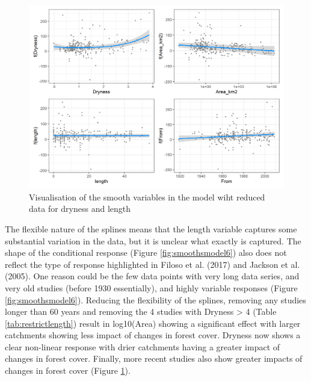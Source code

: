 \documentclass[]{elsarticle} %
\begin{document}
\begin{figure}
\includegraphics[width=0.9\linewidth]{model7_smooths} \caption{Visualisation of the smooth variables in the model wiht reduced data for dryness and length}\label{fig:smoothsmodel7}
\end{figure}

The flexible nature of the splines means that the length variable captures some substantial variation in the data, but it is unclear what exactly is captured. The shape of the conditional response (Figure \ref{fig:smoothsmodel6}) also does not reflect the type of response highlighted in Filoso et al. (2017) and Jackson et al. (2005). One reason could be the few data points with very long data series, and very old studies (before 1930 essentially), and highly variable responses (Figure \ref{fig:smoothsmodel6}). Reducing the flexibility of the splines, removing any studies longer than 60 years and removing the 4 studies with Dryness \textgreater{} 4 (Table \ref{tab:restrictlength}) result in log10(Area) showing a significant effect with larger catchments showing less impact of changes in forest cover. Dryness now shows a clear non-linear response with drier catchments having a greater impact of changes in forest cover. Finally, more recent studies also show greater impacts of changes in forest cover (Figure \ref{fig:smoothsmodel7}).
\end{document}
